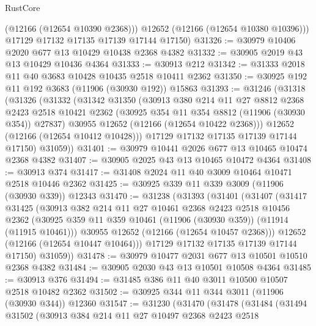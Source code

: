 \begin{lexlean}{RustCore}
\begin{coremodule}
          (@12166 (@12654 @10390 @2368)))
        @12652
        (@12166 (@12654 @10380 @10396)))
      @17129
      @17132
      @17135
      @17139
      @17144
      @17150)
@31326 := @30979 @10406 @2020 @677 @13 @10429 @10438 @2368 @4382
@31332 := @30905 @2019 @43 @13 @10429 @10436 @4364
@31333 := @30913 @212
@31342 := @31333 @2018 @11 @40 @3683 @10428 @10435 @2518 @10411 @2362
@31350 := @30925 @192 @11 @192 @3683 (@11906 (@30930 @192)) @15863
@31393 := @31246
    (@31318
      (@31326
        (@31332
          (@31342
            @31350
            (@30913
              @380
              @214
              @11
              @27
              @8812
              @2368
              @2423
              @2518
              @10421
              @2362
              (@30925 @354 @11 @354 @8812 (@11906 (@30930 @354)) @27837)
              @30955
              @12652
              (@12166 (@12654 @10422 @2368)))
            @12652
            (@12166 (@12654 @10412 @10428)))
          @17129
          @17132
          @17135
          @17139
          @17144
          @17150)
        @31059))
@31401 := @30979 @10441 @2026 @677 @13 @10465 @10474 @2368 @4382
@31407 := @30905 @2025 @43 @13 @10465 @10472 @4364
@31408 := @30913 @374
@31417 := @31408 @2024 @11 @40 @3009 @10464 @10471 @2518 @10446 @2362
@31425 := @30925 @339 @11 @339 @3009 (@11906 (@30930 @339)) @12343
@31470 := @31238
    (@31393
      (@31401
        (@31407
          (@31417
            @31425
            (@30913
              @382
              @214
              @11
              @27
              @10461
              @2368
              @2423
              @2518
              @10456
              @2362
              (@30925 @359 @11 @359 @10461 (@11906 (@30930 @359)) (@11914 (@11915 @10461)))
              @30955
              @12652
              (@12166 (@12654 @10457 @2368)))
            @12652
            (@12166 (@12654 @10447 @10464)))
          @17129
          @17132
          @17135
          @17139
          @17144
          @17150)
        @31059))
@31478 := @30979 @10477 @2031 @677 @13 @10501 @10510 @2368 @4382
@31484 := @30905 @2030 @43 @13 @10501 @10508 @4364
@31485 := @30913 @376
@31494 := @31485 @386 @11 @40 @3011 @10500 @10507 @2518 @10482 @2362
@31502 := @30925 @344 @11 @344 @3011 (@11906 (@30930 @344)) @12360
@31547 := @31230
    (@31470
      (@31478
        (@31484
          (@31494
            @31502
            (@30913
              @384
              @214
              @11
              @27
              @10497
              @2368
              @2423
              @2518

\end{coremodule}
\end{lexlean}
